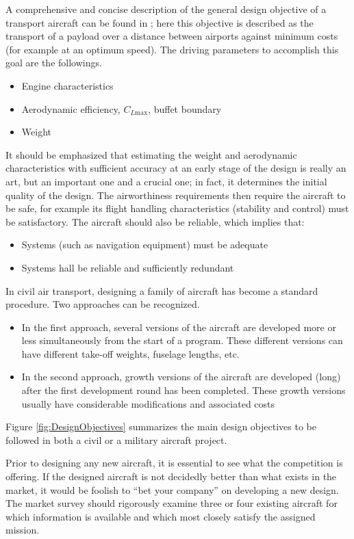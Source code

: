 \bigskip
\noindent
A comprehensive and concise description of the general design objective of a transport aircraft can be found in \cite{obert2009aerodynamic}; here this objective is described as the transport of a payload over a distance between airports against minimum costs (for example at an optimum speed).
The driving parameters to accomplish this goal are the followings.
%
\begin{itemize}
\item Engine characteristics
\item Aerodynamic efficiency, $C_{L\text{max}}$, buffet boundary
\item Weight
\end{itemize}
%
It should be emphasized that estimating the weight and aerodynamic characteristics with sufficient accuracy at an early stage of the design is really an art, but an important one and a crucial one; in fact, it determines the initial quality of the design.
%
The airworthiness requirements then require the aircraft to be safe, for example its flight handling characteristics (stability and control) must be satisfactory. The aircraft should also be reliable, which implies that:
%
\begin{itemize}
\item Systems (such as navigation equipment) must be adequate
\item Systems hall be reliable and sufficiently redundant
\end{itemize}
%
In civil air transport, designing a family of aircraft has become a standard procedure. Two approaches can be recognized.
%
\begin{itemize}
\item In the first approach, several versions of the aircraft are developed more or less simultaneously from the start of a program. These different versions can have different take-off weights, fuselage lengths, etc.
\item In the second approach, growth versions of the aircraft are developed (long) after the first development round has been completed. These growth versions usually have considerable modifications and associated costs
\end{itemize}
%
Figure \ref{fig:DesignObjectives} summarizes the main design objectives to be followed in both a civil or a military aircraft project.

\bigskip
\noindent
Prior to designing any new aircraft, it is essential to see what the competition is offering. If the designed aircraft is not decidedly better than what exists in the market, it would be foolish to “bet your company” on developing a new design. The market survey should rigorously examine three or four existing aircraft for
which information is available and which most closely satisfy the assigned mission.\cite{sforza2014commercial}

